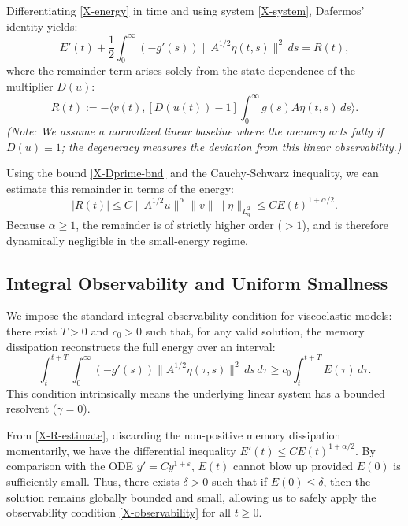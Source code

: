 \documentclass[11pt,reqno]{amsart}
\theoremstyle{remark}
\begin{document}
Differentiating \eqref{X-energy} in time and using system \eqref{X-system}, Dafermos' identity yields:
\[
    E'(t) + \frac{1}{2}\int_0^\infty(-g'(s))\|A^{1/2}\eta(t,s)\|^2\,ds = R(t),
\]
where the remainder term arises solely from the state-dependence of the multiplier $D(u)$:
\begin{equation}
    R(t) := - \bigl\langle v(t), [D(u(t)) - 1] \int_0^\infty g(s)A\eta(t,s)\,ds \bigr\rangle.
\label{X-remainder}
\end{equation}
\textit{(Note: We assume a normalized linear baseline where the memory acts fully if $D(u) \equiv 1$; the degeneracy measures the deviation from this linear observability.)}

Using the bound \eqref{X-Dprime-bnd} and the Cauchy-Schwarz inequality, we can estimate this remainder in terms of the energy:
\begin{equation}
    |R(t)| \le C \|A^{1/2}u\|^\alpha \|v\| \|\eta\|_{L_g^2} \le C E(t)^{1 + \alpha/2}.
\label{X-R-estimate}
\end{equation}
Because $\alpha \ge 1$, the remainder is of strictly higher order ($> 1$), and is therefore dynamically negligible in the small-energy regime.

\subsection{Integral Observability and Uniform Smallness}

We impose the standard integral observability condition for viscoelastic models: there exist $T>0$ and $c_0>0$ such that, for any valid solution, the memory dissipation reconstructs the full energy over an interval:
\begin{equation}
    \int_t^{t+T} \!\! \int_0^\infty (-g'(s))\|A^{1/2}\eta(\tau,s)\|^2\,ds\,d\tau \ge c_0 \int_t^{t+T} E(\tau)\,d\tau.
\label{X-observability}
\end{equation}
This condition intrinsically means the underlying linear system has a bounded resolvent ($\gamma = 0$).

From \eqref{X-R-estimate}, discarding the non-positive memory dissipation momentarily, we have the differential inequality $E'(t) \le C E(t)^{1+\alpha/2}$. By comparison with the ODE $y' = Cy^{1+\varepsilon}$, $E(t)$ cannot blow up provided $E(0)$ is sufficiently small. Thus, there exists $\delta>0$ such that if $E(0) \le \delta$, then the solution remains globally bounded and small, allowing us to safely apply the observability condition \eqref{X-observability} for all $t \ge 0$.
\end{document}
